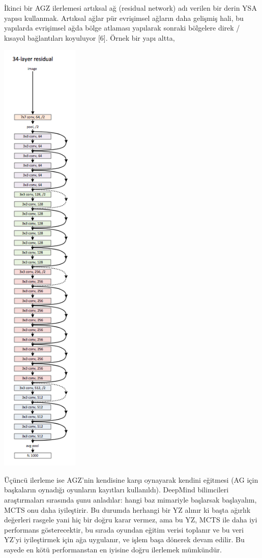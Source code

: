 \documentclass[12pt,fleqn]{article}\usepackage{../../common}
\begin{document}
İkinci bir AGZ ilerlemesi artıksal ağ (residual network) adı verilen bir
derin YSA yapısı kullanmak. Artıksal ağlar pür evrişimsel ağların daha
gelişmiş hali, bu yapılarda evrişimsel ağda bölge atlaması yapılarak
sonraki bölgelere direk / kısayol bağlantıları koyuluyor [6]. Örnek bir
yapı altta,

\includegraphics[width=10em]{resnet34.png}

Üçüncü ilerleme ise AGZ'nin kendisine karşı oynayarak kendini eğitmesi (AG
için başkaların oynadığı oyunların kayıtları kullanıldı). DeepMind
bilimcileri araştırmaları sırasında şunu anladılar: hangi baz mimariyle
başlarsak başlayalım, MCTS onu daha iyileştirir. Bu durumda herhangi bir YZ
alınır ki başta ağırlık değerleri rasgele yani hiç bir doğru karar vermez,
ama bu YZ, MCTS ile daha iyi performans gösterecektir, bu sırada oyundan
eğitim verisi toplanır ve bu veri YZ'yi iyileştirmek için ağa uygulanır, ve
işlem başa dönerek devam edilir. Bu sayede en kötü performanstan en iyisine
doğru ilerlemek mümkündür.
\end{document}
